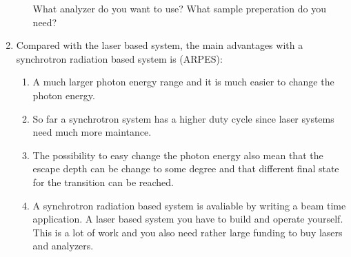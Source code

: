 \documentclass[12pt,a4paper]{article}
\begin{document}
\begin{enumerate}
\begin{enumerate}
                    What analyzer do you want to use? What sample preperation do you need?
            \end{enumerate}
        \item Compared with the laser based system, the main advantages with a synchrotron radiation based system is (ARPES):
            \begin{enumerate}
                \item A much larger photon energy range and it is much easier to change the photon energy.
                \item So far a synchrotron system has a higher duty cycle since laser systems need much more maintance.
                \item The possibility to easy change the photon energy also mean that the escape depth can be change to some degree and that different
                    final state for the transition can be reached.
                \item A synchrotron radiation based system is avaliable by writing a beam time application. A laser based system you have to build and operate yourself.
                    This is a lot of work and you also need rather large funding to buy lasers and analyzers.
            \end{enumerate}
    \end{enumerate}
\end{document}
